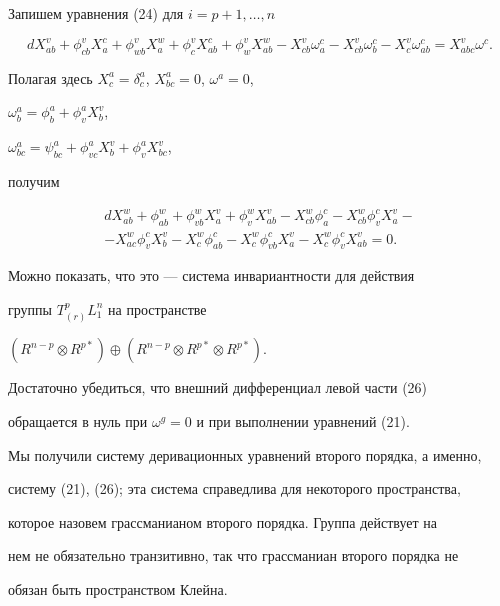 Запишем уравнения (24) для $i = p+1,\dotsc,n$


$$


dX^v_{ab} + \phi^v_{cb} X^c_a + \phi^v_{wb} X^w_a +


\phi^v_c X^c_{ab} + \phi^v_w X^w_{ab} - X^v_{cb} \omega^c_a -


X^v_{cb} \omega^c_b - X^v_c \omega^c_{ab} = X^v_{abc} \omega^c.


$$


Полагая здесь $X^a_c = \delta^a_c$, $X^a_{bc} = 0$, $\omega^a = 0$,


$\omega^a_b = \phi^a_b + \phi^a_v X^v_b$,


$\omega^a_{bc} = \psi^a_{bc} + \phi^a_{vc} X^v_b + \phi^a_v X^v_{bc}$,


получим


\begin{multline}


dX^w_{ab} + \phi^w_{ab} + \phi^w_{vb} X^v_a + \phi^w_v X^v_{ab} -


X^w_{cb} \phi^c_a - X^w_{cb} \phi^c_v X^v_a - \\


- X^w_{ac} \phi^c_v X^v_b - X^w_c \phi^c_{ab} -


X^w_c \phi^c_{vb} X^v_a - X^w_c \phi^c_v X^v_{ab} = 0.


\end{multline}


Можно показать, что это --- система инвариантности для действия


группы $T^p_{(r)} L^n_1$ на пространстве


$(R^{n-p} \otimes R^{p*}) \oplus (R^{n-p} \otimes R^{p*} \otimes R^{p*})$.


Достаточно убедиться, что внешний дифференциал левой части (26)


обращается в нуль при $\omega^g = 0$ и при выполнении уравнений (21).





Мы получили систему деривационных уравнений второго порядка, а именно,


систему (21), (26); эта система справедлива для некоторого пространства,


которое назовем грассманианом второго порядка. Группа действует на


нем не обязательно транзитивно, так что грассманиан второго порядка не


обязан быть пространством Клейна.





